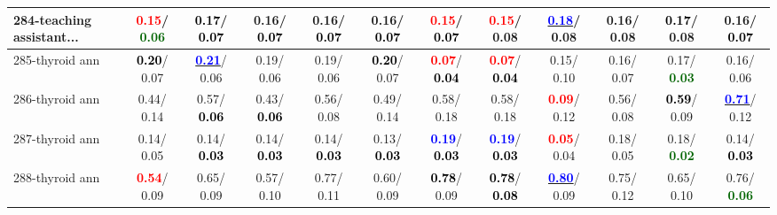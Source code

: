 \begin{table}[h]
\begin{center}
{\begin{tabular}{lc|c|c|c|c|c|c|c|c|c|c}
284-teaching assistant... & \textcolor{red}{\textbf{  0.15}}/\textcolor{darkgreen}{\textbf{  0.06}} & \textcolor{black}{\textbf{  0.17}}/\textcolor{black}{\textbf{  0.07}} &   0.16/\textcolor{black}{\textbf{  0.07}} &   0.16/\textcolor{black}{\textbf{  0.07}} &   0.16/\textcolor{black}{\textbf{  0.07}} & \textcolor{red}{\textbf{  0.15}}/\textcolor{black}{\textbf{  0.07}} & \textcolor{red}{\textbf{  0.15}}/  0.08 & \underline{\textcolor{blue}{\textbf{  0.18}}}/  0.08 &   0.16/  0.08 & \textcolor{black}{\textbf{  0.17}}/  0.08 &   0.16/\textcolor{black}{\textbf{  0.07}} \\ \hline
285-thyroid ann & \textcolor{black}{\textbf{  0.20}}/  0.07 & \underline{\textcolor{blue}{\textbf{  0.21}}}/  0.06 &   0.19/  0.06 &   0.19/  0.06 & \textcolor{black}{\textbf{  0.20}}/  0.07 & \textcolor{red}{\textbf{  0.07}}/\textcolor{black}{\textbf{  0.04}} & \textcolor{red}{\textbf{  0.07}}/\textcolor{black}{\textbf{  0.04}} &   0.15/  0.10 &   0.16/  0.07 &   0.17/\textcolor{darkgreen}{\textbf{  0.03}} &   0.16/  0.06 \\
286-thyroid ann &   0.44/  0.14 &   0.57/\textcolor{black}{\textbf{  0.06}} &   0.43/\textcolor{black}{\textbf{  0.06}} &   0.56/  0.08 &   0.49/  0.14 &   0.58/  0.18 &   0.58/  0.18 & \textcolor{red}{\textbf{  0.09}}/  0.12 &   0.56/  0.08 & \textcolor{black}{\textbf{  0.59}}/  0.09 & \underline{\textcolor{blue}{\textbf{  0.71}}}/  0.12 \\
287-thyroid ann &   0.14/  0.05 &   0.14/\textcolor{black}{\textbf{  0.03}} &   0.14/\textcolor{black}{\textbf{  0.03}} &   0.14/\textcolor{black}{\textbf{  0.03}} &   0.13/\textcolor{black}{\textbf{  0.03}} & \textcolor{blue}{\textbf{  0.19}}/\textcolor{black}{\textbf{  0.03}} & \textcolor{blue}{\textbf{  0.19}}/\textcolor{black}{\textbf{  0.03}} & \textcolor{red}{\textbf{  0.05}}/  0.04 &   0.18/  0.05 &   0.18/\textcolor{darkgreen}{\textbf{  0.02}} &   0.14/\textcolor{black}{\textbf{  0.03}} \\
288-thyroid ann & \textcolor{red}{\textbf{  0.54}}/  0.09 &   0.65/  0.09 &   0.57/  0.10 &   0.77/  0.11 &   0.60/  0.09 & \textcolor{black}{\textbf{  0.78}}/  0.09 & \textcolor{black}{\textbf{  0.78}}/\textcolor{black}{\textbf{  0.08}} & \underline{\textcolor{blue}{\textbf{  0.80}}}/  0.09 &   0.75/  0.12 &   0.65/  0.10 &   0.76/\textcolor{darkgreen}{\textbf{  0.06}} \\\end{tabular}}\label{stratsALCKappa8Allalla}
\end{center}
\end{table}
